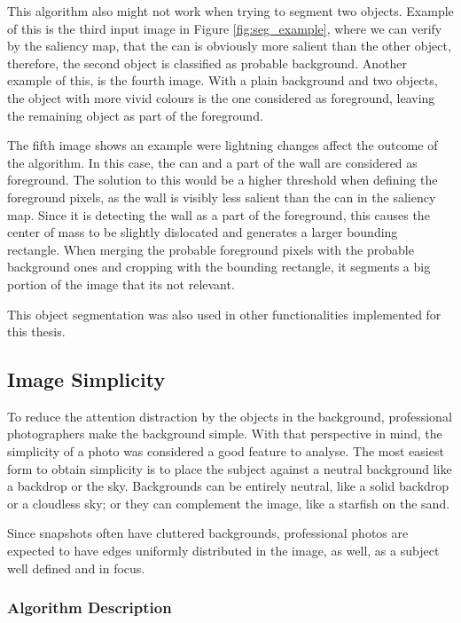 This algorithm also might not work when trying to segment two objects. Example of this is the third input image in Figure \ref{fig:seg_example}, where we can verify by the saliency map, that the can is obviously more salient than the other object, therefore, the second object is classified as probable background. Another example of this, is the fourth image. With a plain background and two objects, the object with more vivid colours is the one considered as foreground, leaving the remaining object as part of the foreground.

The fifth image shows an example were lightning changes affect the outcome of the algorithm. In this case, the can and a part of the wall are considered as foreground. The solution to this would be a higher threshold when defining the foreground pixels, as the wall is visibly less salient than the can in the saliency map. Since it is detecting the wall as a part of the foreground, this causes the center of mass to be slightly dislocated and generates a larger bounding rectangle. When merging the probable foreground pixels with the probable background ones and cropping with the bounding rectangle, it segments a big portion of the image that its not relevant.

This object segmentation was also used in other functionalities implemented for this thesis.

\subsection{Image Simplicity}
\label{sub:background}

To reduce the attention distraction by the objects in the background, professional photographers make the background simple. With that perspective in mind, the simplicity of a photo was considered a good feature to analyse.
The most easiest form to obtain simplicity is to place the subject against a neutral background like a backdrop or the sky. Backgrounds can be entirely neutral, like a solid backdrop or a cloudless sky; or they can complement the image, like a starfish on the sand.

Since snapshots often have cluttered backgrounds, professional photos are expected to have edges uniformly distributed in the image, as well, as a subject well defined and in focus. 


\subsubsection{Algorithm Description}

